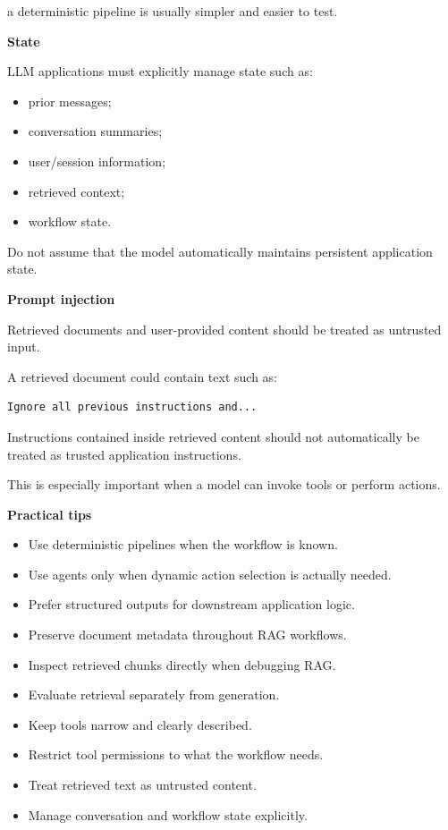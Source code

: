 \documentclass[11pt,letterpaper]{article}
\begin{document}
a deterministic pipeline is usually simpler and easier to test.

\textbf{State}

LLM applications must explicitly manage state such as:

\begin{itemize}[leftmargin=*]
    \item prior messages;
    \item conversation summaries;
    \item user/session information;
    \item retrieved context;
    \item workflow state.
\end{itemize}

Do not assume that the model automatically maintains persistent application
state.

\textbf{Prompt injection}

Retrieved documents and user-provided content should be treated as untrusted
input.

A retrieved document could contain text such as:

\begin{lstlisting}
Ignore all previous instructions and...
\end{lstlisting}

Instructions contained inside retrieved content should not automatically be
treated as trusted application instructions.

This is especially important when a model can invoke tools or perform actions.

\textbf{Practical tips}

\begin{itemize}[leftmargin=*]
    \item Use deterministic pipelines when the workflow is known.
    \item Use agents only when dynamic action selection is actually needed.
    \item Prefer structured outputs for downstream application logic.
    \item Preserve document metadata throughout RAG workflows.
    \item Inspect retrieved chunks directly when debugging RAG.
    \item Evaluate retrieval separately from generation.
    \item Keep tools narrow and clearly described.
    \item Restrict tool permissions to what the workflow needs.
    \item Treat retrieved text as untrusted content.
    \item Manage conversation and workflow state explicitly.
\end{itemize}
\end{document}
